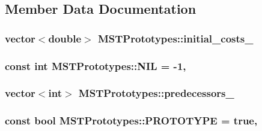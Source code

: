 \subsection{Member Data Documentation}
\hypertarget{classMSTPrototypes_a2674e0559c35f64871c6f3d43c05bbb3}{
\subsubsection[{initial\+\_\+costs\+\_\+}]{\setlength{\rightskip}{0pt plus 5cm}vector$<$double$>$ M\+S\+T\+Prototypes\+::initial\+\_\+costs\+\_\+\hspace{0.3cm}{\ttfamily [private]}}}\label{classMSTPrototypes_a2674e0559c35f64871c6f3d43c05bbb3}
\hypertarget{classMSTPrototypes_a7c70b128526bb6b010c670846821aa6f}{
\subsubsection[{N\+I\+L}]{\setlength{\rightskip}{0pt plus 5cm}const int M\+S\+T\+Prototypes\+::\+N\+I\+L = -\/1\hspace{0.3cm}{\ttfamily [static]}, {\ttfamily [private]}}}\label{classMSTPrototypes_a7c70b128526bb6b010c670846821aa6f}
\hypertarget{classMSTPrototypes_a797e22614528dd54cafeaaa8d67dba4d}{
\subsubsection[{predecessors\+\_\+}]{\setlength{\rightskip}{0pt plus 5cm}vector$<$int$>$ M\+S\+T\+Prototypes\+::predecessors\+\_\+\hspace{0.3cm}{\ttfamily [private]}}}\label{classMSTPrototypes_a797e22614528dd54cafeaaa8d67dba4d}
\hypertarget{classMSTPrototypes_adfc022b1174d52afd0ae7d87e685f49e}{
\subsubsection[{P\+R\+O\+T\+O\+T\+Y\+P\+E}]{\setlength{\rightskip}{0pt plus 5cm}const bool M\+S\+T\+Prototypes\+::\+P\+R\+O\+T\+O\+T\+Y\+P\+E = true\hspace{0.3cm}{\ttfamily [static]}, {\ttfamily [private]}}}\label{classMSTPrototypes_adfc022b1174d52afd0ae7d87e685f49e}
